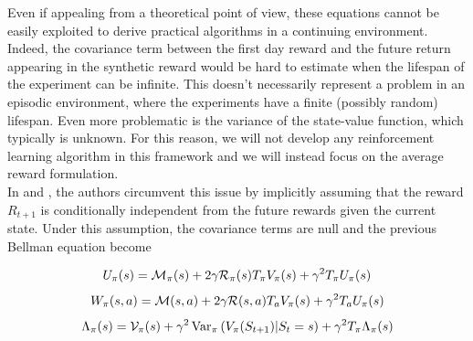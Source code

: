 Even if appealing from a theoretical point of view, these equations cannot be easily exploited to derive practical algorithms in a continuing environment. Indeed, the covariance term between the first day reward and the future return appearing in the synthetic reward would be hard to estimate when the lifespan of the experiment can be infinite. This doesn't necessarily represent a problem in an episodic environment, where the experiments have a finite (possibly random) lifespan. Even more problematic is the variance of the state-value function, which typically is unknown. For this reason, we will not develop any reinforcement learning algorithm in this framework and we will instead focus on the average reward formulation.\\
In \cite{tamar2012policy} and \cite{prashanth2014actor}, the authors circumvent this issue by implicitly assuming that the reward $R_{t+1}$ is conditionally independent from the future rewards given the current state. Under this assumption, the covariance terms are null and the previous Bellman equation become 
\begin{corollary}
	\begin{equation}
		U_\pi(s) = \calM_\pi(s) + 2\gamma \calR_\pi(s) T_\pi V_\pi(s) + \gamma^2 T_\pi U_\pi(s)
	\end{equation}
	\begin{equation}
		W_\pi(s,a) = \calM(s,a) + 2\gamma \calR(s,a) T_a V_\pi(s) + \gamma^2 T_a U_\pi(s)
	\end{equation}
	\begin{equation}
		\Lambda_\pi(s) = \mathcal{V}_\pi(s) + \gamma^2 \Var[\pi]{V_\pi(S_{t+1}) | S_t = s} + \gamma^2 T_\pi \Lambda_\pi(s)	
	\end{equation}
\end{corollary}

